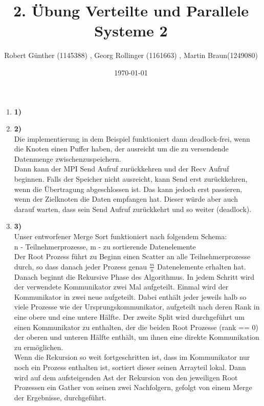 \documentclass[10pt,a4paper]{article}
\title{2. Übung Verteilte und Parallele Systeme 2}
\author{ Robert Günther (1145388) , Georg Rollinger (1161663) , Martin Braun(1249080)}
\date{\today{}}
\begin{document}
\maketitle
\begin{enumerate}

\item[]{\textbf{1)} \\

}

\item[]{\textbf{2)} \\
Die implementierung in dem Beispiel funktioniert dann deadlock-frei, wenn die Knoten einen Puffer haben, der ausreicht um die zu versendende Datenmenge zwischenzuspeichern.\\
Dann kann der MPI Send Aufruf zurückkehren und der Recv Aufruf beginnen. Falls der Speicher nicht ausreicht, kann Send erst zurückkehren, wenn die Übertragung abgeschlossen ist.
Das kann jedoch erst passieren, wenn der Zielknoten die Daten empfangen hat. Dieser würde aber auch darauf warten, dass sein Send Aufruf zurückkehrt und so weiter (deadlock).
}

\item[]{\textbf{3)} \\
Unser entworfener Merge Sort funktioniert nach folgendem Schema: \\
n - Teilnehmerprozesse, m - zu sortierende Datenelemente \\
Der Root Prozess führt zu Beginn einen Scatter an alle Teilnehmerprozesse durch, so dass danach jeder Prozess genau $\frac{m}{n}$ Datenelemente erhalten hat. 
Danach beginnt die Rekursive Phase des Algorithmus. In jedem Schritt wird der verwendete Kommunikator zwei Mal aufgeteilt.
Einmal wird der Kommunikator in zwei neue aufgeteilt. Dabei enthält jeder jeweils halb so viele Prozesse wie der Ursprungskommunikator, aufgeteilt nach deren Rank in eine obere und eine untere Hälfte. 
Der zweite Split wird durchgeführt um einen Kommunikator zu enthalten, der die beiden Root Prozesse (rank == 0) der oberen und unteren Hälfte enthält, um ihnen eine direkte Kommunikation zu ermöglichen.\\

Wenn die Rekursion so weit fortgeschritten ist, dass im Kommunikator nur noch ein Prozess enthalten ist, sortiert dieser seinen Arrayteil lokal. Dann wird auf dem aufsteigenden Ast der Rekursion von den jeweiligen Root Prozessen ein Gather von seinen zwei Nachfolgern, gefolgt von einem Merge der Ergebnisse, durchgeführt.
}
\end{enumerate}
\end{document}
